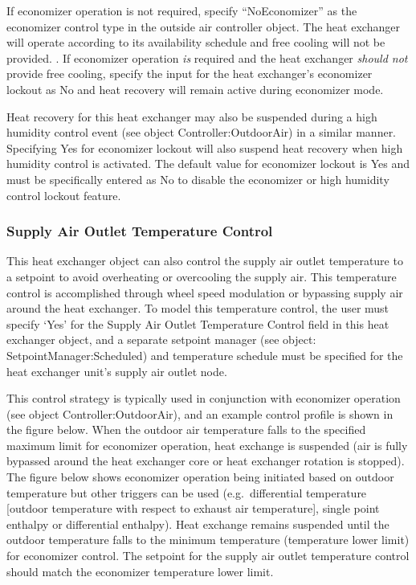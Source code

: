 If economizer operation is not required, specify ``NoEconomizer'' as the economizer control type in the outside air controller object. The heat exchanger will operate according to its availability schedule and free cooling will not be provided. . If economizer operation \emph{is} required and the heat exchanger \emph{should not} provide free cooling, specify the input for the heat exchanger's economizer lockout as No and heat recovery will remain active during economizer mode.

Heat recovery for this heat exchanger may also be suspended during a high humidity control event (see object Controller:OutdoorAir) in a similar manner. Specifying Yes for economizer lockout will also suspend heat recovery when high humidity control is activated. The default value for economizer lockout is Yes and must be specifically entered as No to disable the economizer or high humidity control lockout feature.

\subsubsection{Supply Air Outlet Temperature Control}\label{supply-air-outlet-temperature-control}

This heat exchanger object can also control the supply air outlet temperature to a setpoint to avoid overheating or overcooling the supply air. This temperature control is accomplished through wheel speed modulation or bypassing supply air around the heat exchanger. To model this temperature control, the user must specify `Yes' for the Supply Air Outlet Temperature Control field in this heat exchanger object, and a separate setpoint manager (see object: SetpointManager:Scheduled) and temperature schedule must be specified for the heat exchanger unit's supply air outlet node.

This control strategy is typically used in conjunction with economizer operation (see object Controller:OutdoorAir), and an example control profile is shown in the figure below. When the outdoor air temperature falls to the specified maximum limit for economizer operation, heat exchange is suspended (air is fully bypassed around the heat exchanger core or heat exchanger rotation is stopped). The figure below shows economizer operation being initiated based on outdoor temperature but other triggers can be used (e.g.~differential temperature {[}outdoor temperature with respect to exhaust air temperature{]}, single point enthalpy or differential enthalpy). Heat exchange remains suspended until the outdoor temperature falls to the minimum temperature (temperature lower limit) for economizer control. The setpoint for the supply air outlet temperature control should match the economizer temperature lower limit.

